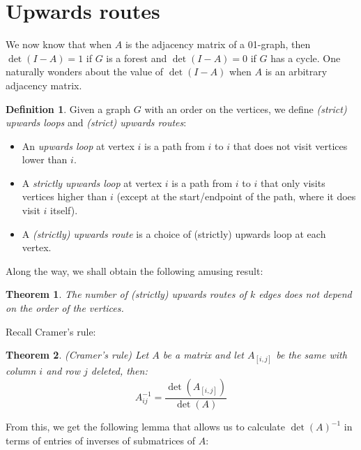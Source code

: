 \documentclass[a4paper, 11pt]{article}
\newtheorem{theorem}{Theorem}[section]
\theoremstyle{definition}
\newtheorem{definition}{Definition}[section]
\begin{document}
\section{Upwards routes}

We now know that when $A$ is the adjacency matrix of a 01-graph, then $\det(I - A) = 1$ if $G$ is a forest and $\det(I - A) = 0$ if $G$ has a cycle. One naturally wonders about the value of $\det(I - A)$ when $A$ is an arbitrary adjacency matrix.

\begin{definition}
  Given a graph $G$ with an order on the vertices, we define \emph{(strict) upwards loops} and \emph{(strict) upwards routes}:
  \begin{itemize}
    \item An \emph{upwards loop} at vertex $i$ is a path from $i$ to $i$ that does not visit vertices lower than $i$.
    \item A \emph{strictly upwards loop} at vertex $i$ is a path from $i$ to $i$ that only visits vertices higher than $i$ (except at the start/endpoint of the path, where it does visit $i$ itself).
    \item A \emph{(strictly) upwards route} is a choice of (strictly) upwards loop at each vertex.
  \end{itemize}
\end{definition}

Along the way, we shall obtain the following amusing result:

\begin{theorem}
  The number of (strictly) upwards routes of $k$ edges does not depend on the order of the vertices.
\end{theorem}

Recall Cramer's rule:
\begin{theorem} (Cramer's rule)
  Let $A$ be a matrix and let $A_{[i,j]}$ be the same with column $i$ and row $j$ deleted, then:
  \[ A^{-1}_{ij} = \frac{\det(A_{[i,j]})}{\det(A)} \]
\end{theorem}

From this, we get the following lemma that allows us to calculate $\det(A)^{-1}$ in terms of entries of inverses of submatrices of $A$:
\end{document}
